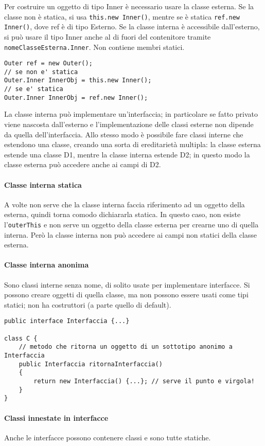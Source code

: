 Per costruire un oggetto di tipo Inner è necessario usare la classe esterna. Se la classe non è statica, si usa \texttt{this.new Inner()}, mentre se è statica \texttt{ref.new Inner()}, dove ref è di tipo Esterno.
Se la classe interna è accessibile dall'esterno, si può usare il tipo Inner anche al di fuori del contenitore tramite \texttt{nomeClasseEsterna.Inner}. 
Non contiene membri statici.
\vspace{2\parskip}
\begin{lstlisting}
Outer ref = new Outer();
// se non e' statica
Outer.Inner InnerObj = this.new Inner();
// se e' statica
Outer.Inner InnerObj = ref.new Inner();
\end{lstlisting}
La classe interna può implementare un'interfaccia; in particolare se fatto privato viene nascosta dall'esterno e l'implementazione delle classi esterne non dipende da quella dell'interfaccia. Allo stesso modo è possibile fare classi interne che estendono una classe, creando una sorta di ereditarietà multipla: la classe esterna estende una classe D1, mentre la classe interna estende D2; in questo modo la classe esterna può accedere anche ai campi di D2.

\paragraph{Classe interna statica} %
A volte non serve che la classe interna faccia riferimento ad un oggetto della esterna, quindi torna comodo dichiararla statica. In questo caso, non esiste l'\texttt{outerThis} e non serve un oggetto della classe esterna per crearne uno di quella interna. Però la classe interna non può accedere ai campi non statici della classe esterna.

\paragraph{Classe interna anonima}
Sono classi interne senza nome, di solito usate per implementare interfacce. Si possono creare oggetti di quella classe, ma non possono essere usati come tipi statici; non ha costruttori (a parte quello di default).
\begin{lstlisting}
public interface Interfaccia {...}

class C {
    // metodo che ritorna un oggetto di un sottotipo anonimo a Interfaccia
    public Interfaccia ritornaInterfaccia()
    {
        return new Interfaccia() {...}; // serve il punto e virgola!
    }
}
\end{lstlisting} 
\paragraph{Classi innestate in interfacce}
Anche le interfacce possono contenere classi e sono tutte statiche.


